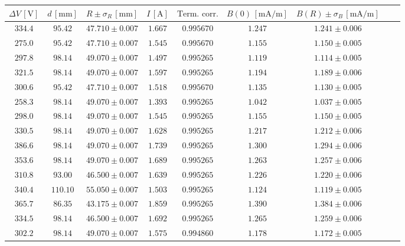 \documentclass[]{article}
\begin{document}
\begin{table}[H]
    \centering

\begin{tabular}{||c|c|c|c|c|c|c|c|c||}
    \hline
    $\Delta V\, [\text{V}] $ & $d\, [\text{mm}] $ & $R \pm \sigma_R\, [\text{mm}] $ & $I\, [\text{A}] $ & $\text{Term. corr.}$ & $B(0)\, [\text{mA/m}] $ & $B(R) \pm \sigma_B\, [\text{mA/m}] $ \\
    \hline\hline
 
    $334.4$ & $95.42$ & $47.710 \pm 0.007$ & $1.667$ & $0.995670$ & $1.247$ & $1.241 \pm 0.006$ \\\hline
    $275.0$ & $95.42$ & $47.710 \pm 0.007$ & $1.545$ & $0.995670$ & $1.155$ & $1.150 \pm 0.005$ \\\hline
    $297.8$ & $98.14$ & $49.070 \pm 0.007$ & $1.497$ & $0.995265$ & $1.119$ & $1.114 \pm 0.005$ \\\hline
    $321.5$ & $98.14$ & $49.070 \pm 0.007$ & $1.597$ & $0.995265$ & $1.194$ & $1.189 \pm 0.006$ \\\hline
    $300.6$ & $95.42$ & $47.710 \pm 0.007$ & $1.518$ & $0.995670$ & $1.135$ & $1.130 \pm 0.005$ \\\hline
    $258.3$ & $98.14$ & $49.070 \pm 0.007$ & $1.393$ & $0.995265$ & $1.042$ & $1.037 \pm 0.005$ \\\hline
    $298.0$ & $98.14$ & $49.070 \pm 0.007$ & $1.545$ & $0.995265$ & $1.155$ & $1.150 \pm 0.005$ \\\hline
    $330.5$ & $98.14$ & $49.070 \pm 0.007$ & $1.628$ & $0.995265$ & $1.217$ & $1.212 \pm 0.006$ \\\hline
    $386.6$ & $98.14$ & $49.070 \pm 0.007$ & $1.739$ & $0.995265$ & $1.300$ & $1.294 \pm 0.006$ \\\hline
    $353.6$ & $98.14$ & $49.070 \pm 0.007$ & $1.689$ & $0.995265$ & $1.263$ & $1.257 \pm 0.006$ \\\hline
    $310.8$ & $93.00$ & $46.500 \pm 0.007$ & $1.639$ & $0.995265$ & $1.226$ & $1.220 \pm 0.006$ \\\hline
    $340.4$ &$110.10$ & $55.050 \pm 0.007$ & $1.503$ & $0.995265$ & $1.124$ & $1.119 \pm 0.005$ \\\hline
    $365.7$ & $86.35$ & $43.175 \pm 0.007$ & $1.859$ & $0.995265$ & $1.390$ & $1.384 \pm 0.006$ \\\hline
    $334.5$ & $98.14$ & $46.500 \pm 0.007$ & $1.692$ & $0.995265$ & $1.265$ & $1.259 \pm 0.006$ \\\hline
    $302.2$ & $98.14$ & $49.070 \pm 0.007$ & $1.575$ & $0.994860$ & $1.178$ & $1.172 \pm 0.005$ \\\hline

\end{tabular}
\end{table}
\end{document}

